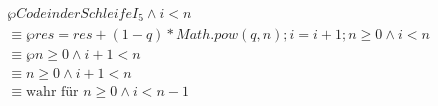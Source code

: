 \documentclass{bschlangaul-aufgabe}
\begin{document}
\begin{bAntwort}
\begin{align*}
&\wp{Code in der Schleife}{I_5 \land i < n}\\
& \equiv \wp{res = res + (1-q) * Math.pow(q, n); i = i + 1;}{n \geq 0 \land i < n} \\
& \equiv \wp{}{n \geq 0 \land i + 1 < n} \\
& \equiv n \geq 0 \land i + 1 < n \\
& \equiv \text{wahr für }n \geq 0 \land i < n - 1 \\
\end{align*}
\end{bAntwort}
\end{document}
